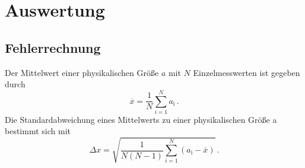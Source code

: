 \section{Auswertung}
\label{sec:Auswertung}
\subsection{Fehlerrechnung}
Der Mittelwert einer physikalischen Größe $a$ mit $N$ Einzelmesswerten ist gegeben durch
\begin{equation}\label{eq:mean}
    \overline{x}=\frac{1}{N}\sum_{i=1}^Na_\text{i}\,.
\end{equation}
Die Standardabweichung eines Mittelwerts zu einer physikalischen Größe a bestimmt sich mit
\begin{equation}\label{eq:std}
    \Delta{x}=\sqrt{\frac{1}{N(N-1)}\sum_{i=1}^N\left(a_\text{i}-\overline{x}\right)}\,.
\end{equation}
